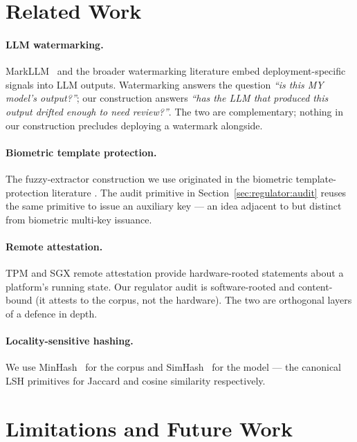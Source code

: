 \documentclass[11pt,a4paper]{article}
\begin{document}
\section{Related Work}
\label{sec:related}

\paragraph{LLM watermarking.}  MarkLLM~\cite{markllm} and the
broader watermarking literature embed deployment\nobreakdash-specific
signals into LLM outputs.  Watermarking answers the question
\emph{``is this MY model's output?''}; our construction answers
\emph{``has the LLM that produced this output drifted enough to
need review?''}.  The two are complementary; nothing in our
construction precludes deploying a watermark alongside.

\paragraph{Biometric template protection.}  The fuzzy\nobreakdash-extractor
construction we use originated in the biometric template\nobreakdash-protection
literature \cite{dodis2008fuzzy}.  The audit primitive in
Section~\ref{sec:regulator:audit} reuses the same primitive to
issue an auxiliary key — an idea adjacent to but distinct from
biometric multi\nobreakdash-key issuance.

\paragraph{Remote attestation.}  TPM and SGX remote attestation
provide hardware\nobreakdash-rooted statements about a platform's
running state.  Our regulator audit is software\nobreakdash-rooted and
content\nobreakdash-bound (it attests to the corpus, not the
hardware).  The two are orthogonal layers of a defence in depth.

\paragraph{Locality\nobreakdash-sensitive hashing.}  We use
MinHash~\cite{broder1997minhash} for the corpus and
SimHash~\cite{charikar2002simhash} for the model — the canonical
LSH primitives for Jaccard and cosine similarity respectively.

\section{Limitations and Future Work}
\label{sec:future}
\end{document}
